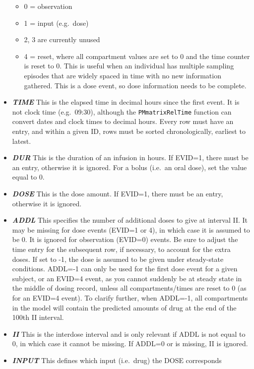 \documentclass[
]{book}
\begin{document}
\begin{itemize}
  \begin{itemize}
  \item
    0 = observation
  \item
    1 = input (e.g.~dose)
  \item
    2, 3 are currently unused
  \item
    4 = reset, where all compartment values are set to 0 and the time
    counter is reset to 0. This is useful when an individual has multiple
    sampling episodes that are widely spaced in time with no new
    information gathered. This is a dose event, so dose information needs
    to be complete.
  \end{itemize}
\item
  \textbf{\emph{TIME}} This is the elapsed time in decimal hours since the first
  event. It is not clock time (e.g.~09:30), although the \texttt{PMmatrixRelTime}
  function can convert dates and clock times to decimal hours.
  Every row must have an entry, and within a given ID, rows
  must be sorted chronologically, earliest to latest.
\item
  \textbf{\emph{DUR}} This is the duration of an infusion in hours. If EVID=1,
  there must be an entry, otherwise it is ignored. For a bolus (i.e.~an
  oral dose), set the value equal to 0.
\item
  \textbf{\emph{DOSE}} This is the dose amount. If EVID=1, there must be an entry,
  otherwise it is ignored.
\item
  \textbf{\emph{ADDL}} This specifies the number of additional doses to give at
  interval II. It may be missing for dose events (EVID=1 or 4), in which
  case it is assumed to be 0. It is ignored for observation (EVID=0)
  events. Be sure to adjust the time entry for the subsequent row, if
  necessary, to account for the extra doses. If set to -1, the dose is
  assumed to be given under steady-state conditions. ADDL=-1 can only be
  used for the first dose event for a given subject, or an EVID=4 event,
  as you cannot suddenly be at steady state in the middle of dosing
  record, unless all compartments/times are reset to 0 (as for an EVID=4
  event). To clarify further, when ADDL=-1, all compartments in the
  model will contain the predicted amounts of drug at the end of the
  100th II interval.
\item
  \textbf{\emph{II}} This is the interdose interval and is only relevant if ADDL
  is not equal to 0, in which case it cannot be missing. If ADDL=0 or is
  missing, II is ignored.
\item
  \textbf{\emph{INPUT}} This defines which input (i.e.~drug) the DOSE corresponds

\end{itemize}
\end{document}
